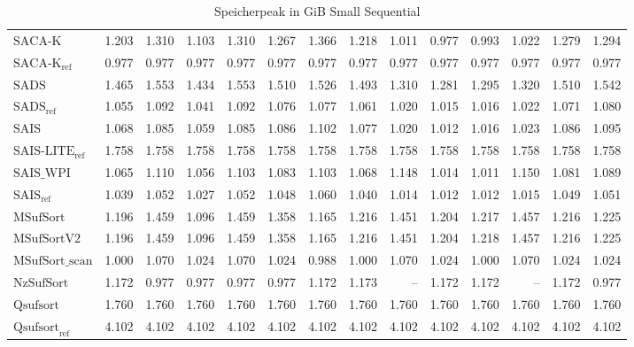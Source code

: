 \begin{table}[h]
{\begin{tabular}{lrrrrrrrrrrrrr}
    $\text{SACA-K}$ & 1.203 & 1.310 & 1.103 & 1.310 & 1.267 & 1.366 & 1.218 & 1.011 & 0.977 & 0.993 & 1.022 & 1.279 & 1.294 \\
    $\text{SACA-K}_{\text{ref}}$ & {\color{green!60!black}0.977} & {\color{green!60!black}0.977} & {\color{green!60!black}0.977} & {\color{green!60!black}0.977} & {\color{green!60!black}0.977} & {\color{green!60!black}0.977} & {\color{green!60!black}0.977} & {\color{green!60!black}0.977} & {\color{green!60!black}0.977} & {\color{green!60!black}0.977} & {\color{green!60!black}0.977} & {\color{green!60!black}0.977} & {\color{green!60!black}0.977} \\
    $\text{SADS}$ & 1.465 & 1.553 & 1.434 & 1.553 & 1.510 & 1.526 & 1.493 & 1.310 & 1.281 & 1.295 & 1.320 & 1.510 & 1.542 \\
    $\text{SADS}_{\text{ref}}$ & 1.055 & 1.092 & 1.041 & 1.092 & 1.076 & 1.077 & 1.061 & 1.020 & 1.015 & 1.016 & 1.022 & 1.071 & 1.080 \\
    $\text{SAIS}$ & 1.068 & 1.085 & 1.059 & 1.085 & 1.086 & 1.102 & 1.077 & 1.020 & 1.012 & 1.016 & 1.023 & 1.086 & 1.095 \\
    $\text{SAIS-LITE}_{\text{ref}}$ & 1.758 & 1.758 & 1.758 & 1.758 & 1.758 & 1.758 & 1.758 & 1.758 & 1.758 & 1.758 & 1.758 & 1.758 & 1.758 \\
    $\text{SAIS\_WPI}$ & 1.065 & 1.110 & 1.056 & 1.103 & 1.083 & 1.103 & 1.068 & 1.148 & 1.014 & 1.011 & 1.150 & 1.081 & 1.089 \\
    $\text{SAIS}_{\text{ref}}$ & 1.039 & 1.052 & 1.027 & 1.052 & 1.048 & 1.060 & 1.040 & 1.014 & 1.012 & 1.012 & 1.015 & 1.049 & 1.051 \\
    $\text{MSufSort}$ & 1.196 & 1.459 & 1.096 & 1.459 & 1.358 & 1.165 & 1.216 & 1.451 & 1.204 & 1.217 & 1.457 & 1.216 & 1.225 \\
    $\text{MSufSortV2}$ & 1.196 & 1.459 & 1.096 & 1.459 & 1.358 & 1.165 & 1.216 & 1.451 & 1.204 & 1.218 & 1.457 & 1.216 & 1.225 \\
    $\text{MSufSort\_scan}$ & 1.000 & 1.070 & 1.024 & 1.070 & 1.024 & 0.988 & 1.000 & 1.070 & 1.024 & 1.000 & 1.070 & 1.024 & 1.024 \\
    $\text{NzSufSort}$ & 1.172 & {\color{green!60!black}0.977} & {\color{green!60!black}0.977} & {\color{green!60!black}0.977} & 0.977 & 1.172 & 1.173 & {\color{darkgray}--} & 1.172 & 1.172 & {\color{darkgray}--} & 1.172 & 0.977 \\
    $\text{Qsufsort}$ & 1.760 & 1.760 & 1.760 & 1.760 & 1.760 & 1.760 & 1.760 & 1.760 & 1.760 & 1.760 & 1.760 & 1.760 & 1.760 \\
    $\text{Qsufsort}_{\text{ref}}$ & 4.102 & 4.102 & 4.102 & 4.102 & 4.102 & 4.102 & 4.102 & 4.102 & 4.102 & 4.102 & 4.102 & 4.102 & 4.102 \\
\bottomrule
\end{tabular}
}
\caption{Speicherpeak in GiB Small Sequential}
\label{messung:tab:memory-small-seq-none}
\end{table}
